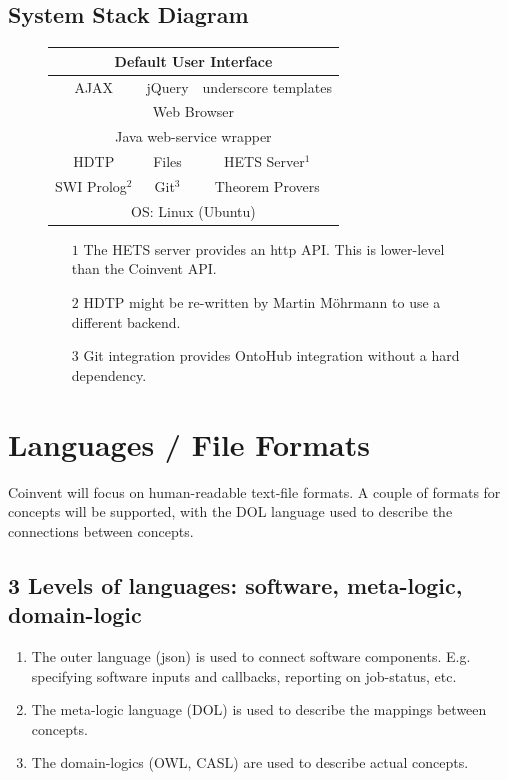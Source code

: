 \documentclass[10pt]{article}
\begin{document}
\subsection{System Stack Diagram}

\begin{figure}[!h]
\begin{center}
\begin{tabular}{|c|c|c|}
\hline
\multicolumn{3}{|c|}{Default User Interface}\\
\hline
AJAX&jQuery&underscore templates\\
\hline
\multicolumn{3}{|c|}{Web Browser}\\
\hline
\multicolumn{3}{|c|}{Java web-service wrapper}\\
\hline
HDTP&Files&HETS Server$^1$\\
\hline
SWI Prolog$^2$&Git$^3$&Theorem Provers\\
\hline
\multicolumn{3}{|c|}{OS: Linux (Ubuntu)}\\
\hline
\end{tabular}
\end{center}
\begin{footnotesize}
\begin{itemize}
\item[$1$]{The HETS server provides an http API. This is lower-level than the Coinvent API.}
\item[$2$]{HDTP might be re-written by Martin Möhrmann to use a different backend.}
\item[$3$]{Git integration provides OntoHub integration without a hard dependency.}
\end{itemize}
\end{footnotesize}
\end{figure}

\section{Languages / File Formats}\label{sec:languages}

Coinvent will focus on human-readable text-file formats. 
A couple of formats for concepts will be supported, with the DOL language used to describe the connections between concepts.
\subsection{3 Levels of languages: software, meta-logic, domain-logic}
\begin{enumerate}
\item The outer language (json) is used to connect software components. E.g. specifying software inputs and callbacks, reporting on job-status, etc.
\item The meta-logic language (DOL) is used to describe the mappings between concepts.
\item The domain-logics (OWL, CASL) are used to describe actual concepts.
\end{enumerate}
\end{document}
